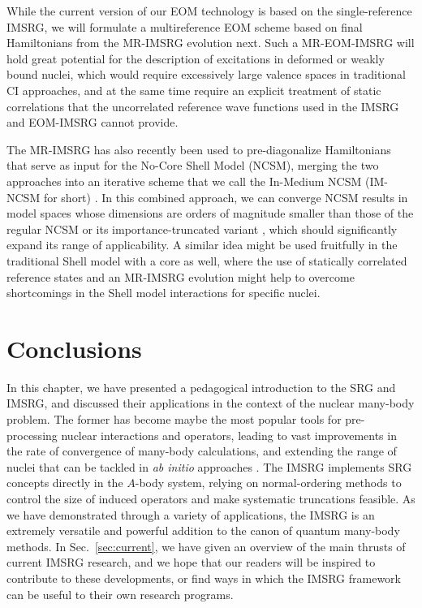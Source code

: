 While the current version of our EOM technology is based on the single-reference
IMSRG, we will formulate a multireference EOM scheme based on final 
Hamiltonians from the MR-IMSRG evolution next. Such a MR-EOM-IMSRG
will hold great potential for the description of excitations in 
deformed or weakly bound nuclei, which would require excessively 
large valence spaces in traditional CI approaches, and at the same
time require an explicit treatment of static correlations that the
uncorrelated reference wave functions used in the IMSRG and EOM-IMSRG
cannot provide. 

The MR-IMSRG has also recently been used to pre-diagonalize Hamiltonians
that serve as input for the No-Core Shell Model (NCSM), merging the two 
approaches into an iterative scheme that we call the In-Medium NCSM (IM-NCSM 
for short) \cite{Gebrerufael:2016rp}. In this combined approach, we can
converge NCSM results in model spaces whose dimensions are orders of
magnitude smaller than those of the regular NCSM or its importance-truncated
variant \cite{Roth:2007fk,Roth:2009eu,Roth:2014fk}, which should significantly
expand its range of applicability. A similar idea might be used fruitfully
in the traditional Shell model with a core as well, where the use of 
statically correlated reference states and an MR-IMSRG evolution might
help to overcome shortcomings in the Shell model interactions for specific
nuclei.
\section{\label{sec:conclusions}Conclusions}
In this chapter, we have presented a pedagogical introduction to the
SRG and IMSRG, and discussed their applications in the context of the
nuclear many-body problem. The former has become maybe the most popular
tools for pre-processing nuclear interactions and operators, leading to
vast improvements in the rate of convergence of many-body calculations,
and extending the range of nuclei that can be tackled in \emph{ab initio}
approaches \cite{Barrett:2013oq,Hagen:2014ve,Binder:2014fk,Soma:2014eu,
Hergert:2016jk,Hergert:2017kx}. The IMSRG implements SRG concepts directly
in the $A$-body system, relying on normal-ordering methods to control
the size of induced operators and make systematic truncations feasible.
As we have demonstrated through a variety of applications, the IMSRG
is an extremely versatile and powerful addition to the canon of 
quantum many-body methods. In Sec.~\ref{sec:current}, we have given
an overview of the main thrusts of current IMSRG research, and we
hope that our readers will be inspired to contribute to these developments,
or find ways in which the IMSRG framework can be useful to their
own research programs. 

